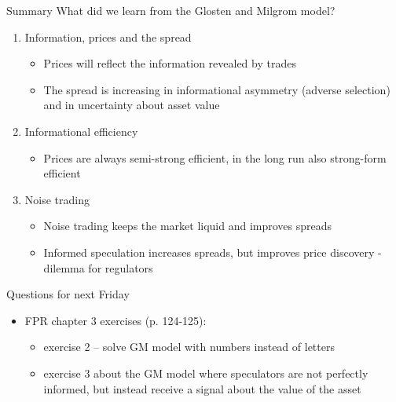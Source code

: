 \documentclass[english,10pt]{beamer}
\begin{document}
\begin{frame}{Summary}
	What did we learn from the Glosten and Milgrom model?
	\begin{enumerate}
		\item Information, prices and the spread
		\begin{itemize}
			\item Prices will reflect the information revealed by trades
			\item The spread is increasing in informational asymmetry (adverse selection) and in uncertainty about asset value
		\end{itemize}
		\item Informational efficiency
		\begin{itemize}
			\item Prices are always semi-strong efficient, in the long run also strong-form efficient
		\end{itemize}
		\item Noise trading
		\begin{itemize}
			\item Noise trading keeps the market liquid and improves spreads
			\item Informed speculation increases spreads, but improves price discovery - dilemma for regulators
		\end{itemize}
	\end{enumerate}
\end{frame}


\begin{frame}{Questions for next Friday}
	\begin{itemize}
		\item FPR chapter 3 exercises (p. 124-125):
		\begin{itemize}
			\item exercise 2 -- solve GM model with numbers instead of letters
			\item exercise 3 about the GM model where speculators are not perfectly informed, but instead receive a signal about the value of the asset
		\end{itemize}
	\end{itemize}
\end{frame}
\end{document}
